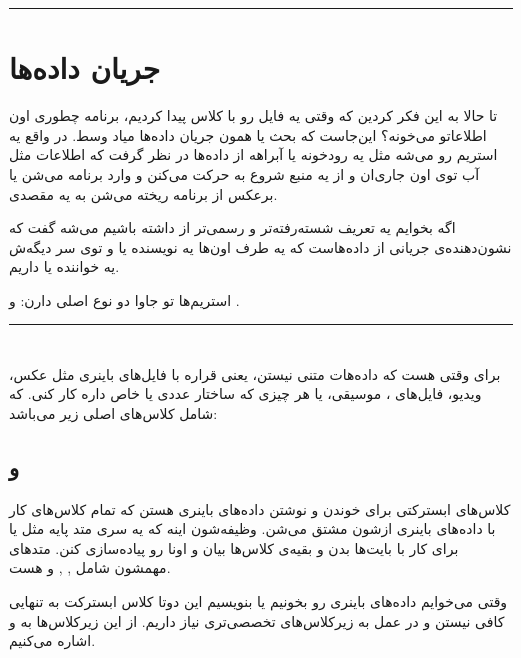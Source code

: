 \begin{center}\rule{0.5\linewidth}{0.5pt}\end{center}

\section{جریان داده‌ها }

تا حالا به این فکر کردین که وقتی یه فایل رو با کلاس 
پیدا کردیم، برنامه‌ چطوری اون اطلاعاتو می‌خونه؟ این‌جاست که بحث 
یا همون جریان داده‌ها میاد وسط. در واقع یه استریم رو می‌شه مثل یه رودخونه
یا آبراهه از داده‌ها در نظر گرفت که اطلاعات مثل آب توی اون جاری‌ان و از یه
منبع شروع به حرکت می‌کنن و وارد برنامه می‌شن یا برعکس از برنامه ریخته می‌شن
به یه مقصدی.

اگه بخوایم یه تعریف شسته‌رفته‌تر و رسمی‌تر از  داشته باشیم می‌شه
گفت که  نشون‌دهنده‌ی جریانی از داده‌هاست که یه طرف اون‌ها یه
نویسنده یا  و توی سر دیگه‌ش یه خواننده یا  داریم.

استریم‌ها تو جاوا دو نوع اصلی دارن: \textbf{} و
\textbf{}.

\begin{center}\rule{0.5\linewidth}{0.5pt}\end{center}

\section{}

برای وقتی هست که داده‌هات متنی نیستن، یعنی قراره با فایل‌های باینری مثل
عکس، ویدیو، فایل‌های  ، موسیقی، یا هر چیزی که ساختار عددی یا خاص
داره کار کنی. که شامل کلاس‌های اصلی زیر می‌باشد:

\subsection{ و }

کلاس‌های ابسترکتی برای خوندن و نوشتن داده‌های باینری هستن که تمام کلاس‌های
کار با داده‌های باینری ازشون مشتق می‌شن. وظیفه‌شون اینه که یه سری متد پایه
مثل  یا  برای کار با بایت‌ها بدن و
بقیه‌ی کلاس‌ها بیان و اونا رو پیاده‌سازی کنن. متدهای مهمشون شامل
, ,  و
 هست.

وقتی می‌خوایم داده‌های باینری رو بخونیم یا بنویسیم این دوتا کلاس ابسترکت
به تنهایی کافی نیستن و در عمل به زیرکلاس‌های تخصصی‌تری نیاز داریم. از این
زیرکلاس‌ها به  و
 اشاره می‌کنیم.

